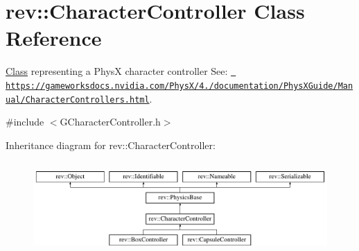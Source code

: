\hypertarget{classrev_1_1_character_controller}{}\section{rev\+::Character\+Controller Class Reference}
\label{classrev_1_1_character_controller}


\mbox{\hyperlink{struct_class}{Class}} representing a PhysX character controller See\+: \href{https://gameworksdocs.nvidia.com/PhysX/4.0/documentation/PhysXGuide/Manual/CharacterControllers.html}{\texttt{ https\+://gameworksdocs.\+nvidia.\+com/\+Phys\+X/4./documentation/\+Phys\+X\+Guide/\+Manual/\+Character\+Controllers.\+html}}.  




{\ttfamily \#include $<$G\+Character\+Controller.\+h$>$}

Inheritance diagram for rev\+::Character\+Controller\+:\begin{figure}[H]
\begin{center}
\leavevmode
\includegraphics[height=3.544304cm]{classrev_1_1_character_controller}
\end{center}
\end{figure}
